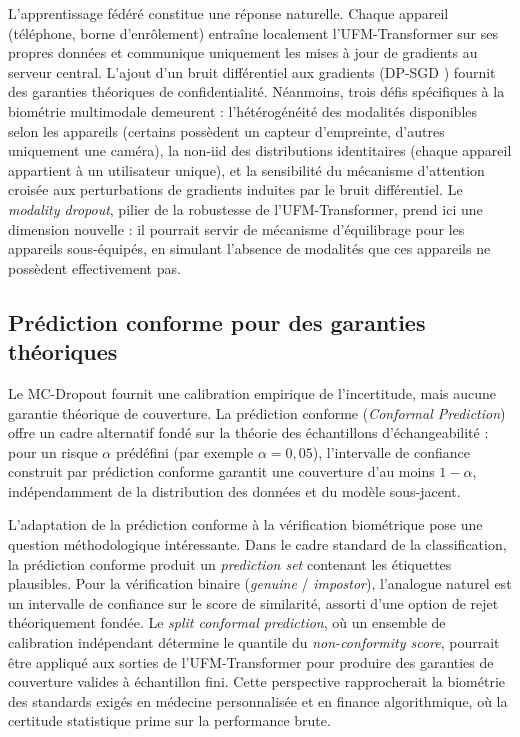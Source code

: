 \documentclass[12pt,a4paper]{report}
\begin{document}
L'apprentissage f\'{e}d\'{e}r\'{e} \cite{mcmahan2017communication} constitue une r\'{e}ponse naturelle. Chaque appareil (t\'{e}l\'{e}phone, borne d'enr\^{o}lement) entra\^{i}ne localement l'UFM-Transformer sur ses propres donn\'{e}es et communique uniquement les mises \`{a} jour de gradients au serveur central. L'ajout d'un bruit diff\'{e}rentiel \cite{dwork2006differential} aux gradients (DP-SGD \cite{abadi2016deep}) fournit des garanties th\'{e}oriques de confidentialit\'{e}. N\'{e}anmoins, trois d\'{e}fis sp\'{e}cifiques \`{a} la biom\'{e}trie multimodale demeurent : l'h\'{e}t\'{e}rog\'{e}n\'{e}it\'{e} des modalit\'{e}s disponibles selon les appareils (certains poss\`{e}dent un capteur d'empreinte, d'autres uniquement une cam\'{e}ra), la non-iid des distributions identitaires (chaque appareil appartient \`{a} un utilisateur unique), et la sensibilit\'{e} du m\'{e}canisme d'attention crois\'{e}e aux perturbations de gradients induites par le bruit diff\'{e}rentiel. Le \emph{modality dropout}, pilier de la robustesse de l'UFM-Transformer, prend ici une dimension nouvelle : il pourrait servir de m\'{e}canisme d'\'{e}quilibrage pour les appareils sous-\'{e}quip\'{e}s, en simulant l'absence de modalit\'{e}s que ces appareils ne poss\`{e}dent effectivement pas.

\subsection{Pr\'{e}diction conforme pour des garanties th\'{e}oriques}
\label{sec:pred-conforme}

Le MC-Dropout fournit une calibration empirique de l'incertitude, mais aucune garantie th\'{e}orique de couverture. La pr\'{e}diction conforme (\emph{Conformal Prediction}) \cite{balomenos2018automatic} offre un cadre alternatif fond\'{e} sur la th\'{e}orie des \'{e}chantillons d'\'{e}changeabilit\'{e} : pour un risque $\alpha$ pr\'{e}d\'{e}fini (par exemple $\alpha = 0{,}05$), l'intervalle de confiance construit par pr\'{e}diction conforme garantit une couverture d'au moins $1 - \alpha$, ind\'{e}pendamment de la distribution des donn\'{e}es et du mod\`{e}le sous-jacent.

L'adaptation de la pr\'{e}diction conforme \`{a} la v\'{e}rification biom\'{e}trique pose une question m\'{e}thodologique int\'{e}ressante. Dans le cadre standard de la classification, la pr\'{e}diction conforme produit un \emph{prediction set} contenant les \'{e}tiquettes plausibles. Pour la v\'{e}rification binaire (\emph{genuine} / \emph{impostor}), l'analogue naturel est un intervalle de confiance sur le score de similarit\'{e}, assorti d'une option de rejet th\'{e}oriquement fond\'{e}e. Le \emph{split conformal prediction}, o\`{u} un ensemble de calibration ind\'{e}pendant d\'{e}termine le quantile du \emph{non-conformity score}, pourrait \^{e}tre appliqu\'{e} aux sorties de l'UFM-Transformer pour produire des garanties de couverture valides \`{a} \'{e}chantillon fini. Cette perspective rapprocherait la biom\'{e}trie des standards exig\'{e}s en m\'{e}decine personnalis\'{e}e et en finance algorithmique, o\`{u} la certitude statistique prime sur la performance brute.
\end{document}

